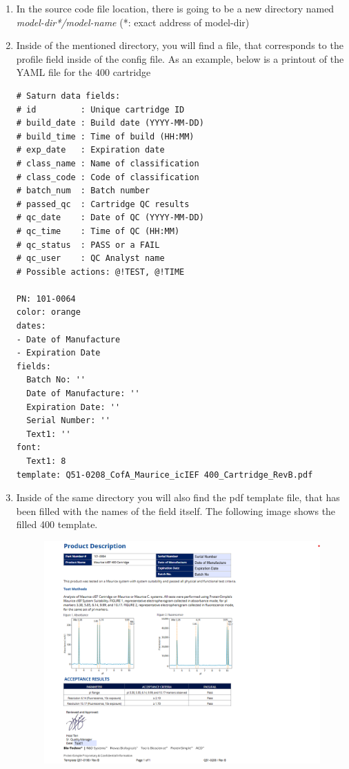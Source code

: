 \documentclass[12pt,a4paper]{article}
\begin{document}
\begin{enumerate}
  \item In the source code file location, there is going to be a new directory named \textit{model-dir*/model-name} (*: exact address of model-dir)
  \item Inside of the mentioned directory, you will find a file, that corresponds to the profile field inside of the config file.
        As an example, below is a printout of the YAML file for the 400 cartridge
        \begin{lstlisting}
# Saturn data fields:
# id         : Unique cartridge ID
# build_date : Build date (YYYY-MM-DD)
# build_time : Time of build (HH:MM)
# exp_date   : Expiration date
# class_name : Name of classification
# class_code : Code of classification
# batch_num  : Batch number
# passed_qc  : Cartridge QC results
# qc_date    : Date of QC (YYYY-MM-DD)
# qc_time    : Time of QC (HH:MM)
# qc_status  : PASS or a FAIL
# qc_user    : QC Analyst name
# Possible actions: @!TEST, @!TIME

PN: 101-0064
color: orange
dates:
- Date of Manufacture
- Expiration Date
fields:
  Batch No: ''
  Date of Manufacture: ''
  Expiration Date: ''
  Serial Number: ''
  Text1: ''
font:
  Text1: 8
template: Q51-0208_CofA_Maurice_icIEF 400_Cartridge_RevB.pdf
        \end{lstlisting}
   \item Inside of the same directory you will also find the pdf template file,
         that has been filled with the names of the field itself. The following
         image shows the filled 400 template. 
         \begin{figure}[h] %
            \centering
            \includegraphics[width=1.0\textwidth]{template.png} %
            
            \label{fig:example}
        \end{figure}
\end{enumerate}
\end{document}
